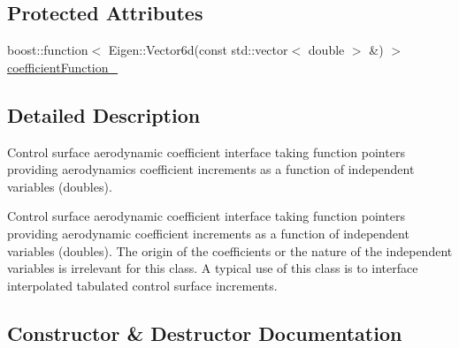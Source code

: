 \subsection*{Protected Attributes}
\begin{DoxyCompactItemize}
\item 
boost\+::function$<$ Eigen\+::\+Vector6d(const std\+::vector$<$ double $>$ \&) $>$ \hyperlink{classtudat_1_1aerodynamics_1_1CustomControlSurfaceIncrementAerodynamicInterface_aeb14a5bff5abbf9653de56b75be92ebb}{coefficient\+Function\+\_\+}
\end{DoxyCompactItemize}


\subsection{Detailed Description}
Control surface aerodynamic coefficient interface taking function pointers providing aerodynamics coefficient increments as a function of independent variables (doubles).

Control surface aerodynamic coefficient interface taking function pointers providing aerodynamic coefficient increments as a function of independent variables (doubles). The origin of the coefficients or the nature of the independent variables is irrelevant for this class. A typical use of this class is to interface interpolated tabulated control surface increments. 

\subsection{Constructor \& Destructor Documentation}
